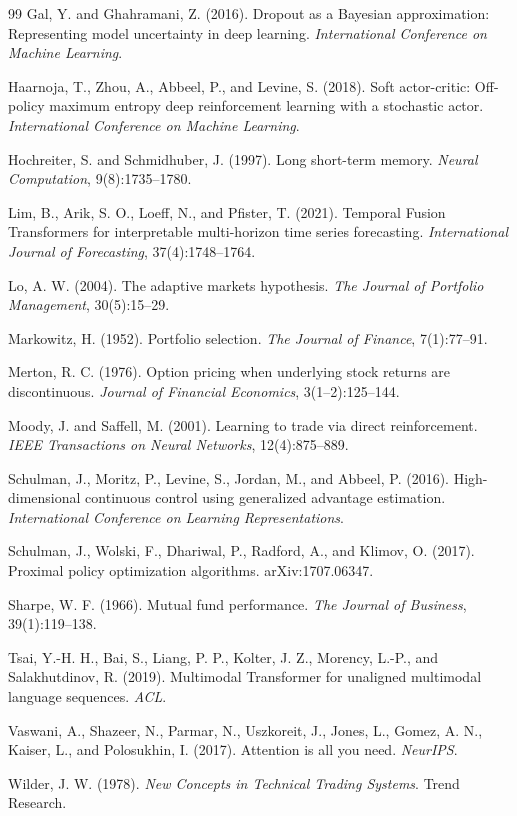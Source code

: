 \documentclass[10pt]{article}
\begin{document}
\begin{thebibliography}{99}
	Gal, Y. and Ghahramani, Z. (2016).
	\newblock Dropout as a Bayesian approximation: Representing model uncertainty in deep learning.
	\newblock \emph{International Conference on Machine Learning}.

	Haarnoja, T., Zhou, A., Abbeel, P., and Levine, S. (2018).
	\newblock Soft actor-critic: Off-policy maximum entropy deep reinforcement learning with a
	stochastic actor.
	\newblock \emph{International Conference on Machine Learning}.

	Hochreiter, S. and Schmidhuber, J. (1997).
	\newblock Long short-term memory.
	\newblock \emph{Neural Computation}, 9(8):1735--1780.

	Lim, B., Arik, S. O., Loeff, N., and Pfister, T. (2021).
	\newblock Temporal Fusion Transformers for interpretable multi-horizon time series forecasting.
	\newblock \emph{International Journal of Forecasting}, 37(4):1748--1764.

	Lo, A. W. (2004).
	\newblock The adaptive markets hypothesis.
	\newblock \emph{The Journal of Portfolio Management}, 30(5):15--29.

	Markowitz, H. (1952).
	\newblock Portfolio selection.
	\newblock \emph{The Journal of Finance}, 7(1):77--91.

	Merton, R. C. (1976).
	\newblock Option pricing when underlying stock returns are discontinuous.
	\newblock \emph{Journal of Financial Economics}, 3(1--2):125--144.

	Moody, J. and Saffell, M. (2001).
	\newblock Learning to trade via direct reinforcement.
	\newblock \emph{IEEE Transactions on Neural Networks}, 12(4):875--889.

	Schulman, J., Moritz, P., Levine, S., Jordan, M., and Abbeel, P. (2016).
	\newblock High-dimensional continuous control using generalized advantage estimation.
	\newblock \emph{International Conference on Learning Representations}.

	Schulman, J., Wolski, F., Dhariwal, P., Radford, A., and Klimov, O. (2017).
	\newblock Proximal policy optimization algorithms.
	\newblock arXiv:1707.06347.

	Sharpe, W. F. (1966).
	\newblock Mutual fund performance.
	\newblock \emph{The Journal of Business}, 39(1):119--138.

	Tsai, Y.-H. H., Bai, S., Liang, P. P., Kolter, J. Z., Morency, L.-P., and Salakhutdinov, R. (2019).
	\newblock Multimodal Transformer for unaligned multimodal language sequences.
	\newblock \emph{ACL}.

	Vaswani, A., Shazeer, N., Parmar, N., Uszkoreit, J., Jones, L., Gomez, A. N., Kaiser, L.,
	and Polosukhin, I. (2017).
	\newblock Attention is all you need.
	\newblock \emph{NeurIPS}.

	Wilder, J. W. (1978).
	\newblock \emph{New Concepts in Technical Trading Systems}.
	\newblock Trend Research.

\end{thebibliography}
\end{document}
